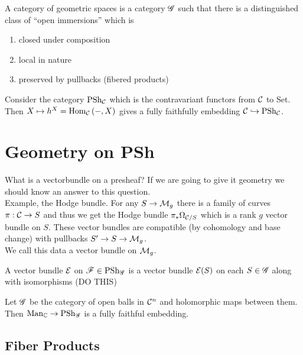 \documentclass[12pt]{article}
\begin{document}
\begin{defn}
A category of geometric spaces is a category $\mathscr{G}$ such that there is a distinguished class of ``open immersions'' which is 
\begin{enumerate}
\item closed under composition
\item local in nature
\item preserved by pullbacks (fibered products)
\end{enumerate}
\end{defn}

\newcommand{\PSh}{\mathrm{PSh}}

\begin{prop}[Yonega]
Consider the category $\PSh_\C$ which is the contravariant functors from $\mathcal{C}$ to Set. Then $X \mapsto h^X = \mathrm{Hom}_{\mathcal{C}} \left( -, X \right)$ gives a fully faithfully embedding $\C \embed \PSh_\C$.
\end{prop}

\section{Geometry on PSh}

What is a vectorbundle on a presheaf? If we are going to give it geometry we should know an answer to this question. 
\bigskip\\
Example, the Hodge bundle. For any $S \to \mathcal{M}_g$ there is a family of curves $\pi : \mathcal{C} \to S$ and thus we get the Hodge bundle $\pi_* \Omega_{\mathcal{C}/S}$ which is a rank $g$ vector bundle on $S$. These vector bundles are compatible (by cohomology and base change) with pullbacks $S' \to S \to \mathcal{M}_g$. 
\bigskip\\
We call this data a vector bundle on $\mathcal{M}_g$.

\begin{defn}
A vector bundle $\mathcal{E}$ on $\F \in \PSh_\G$ is a vector bundle $\mathcal{E}(S)$ on each $S \in \mathscr{G}$ along with isomorphisms (DO THIS)
\end{defn}

\begin{exercise}
Let $\mathscr{G}$ be the category of open balls in $\mathcal{C}^n$ and holomorphic maps between them. Then $\mathrm{Man}_{\mathbb{C}} \to \PSh_\G$ is a fully faithful embedding.
\end{exercise}

\subsection{Fiber Products}
\end{document}
